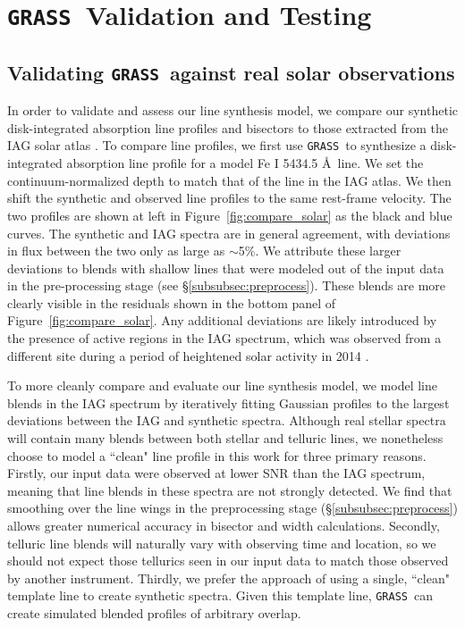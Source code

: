 \documentclass[twocolumn]{aastex63}
\newcommand{\grass}{\texttt{GRASS}}
\newcommand{\revise}[1]{#1}
\begin{document}
\section{\grass\ Validation and Testing} \label{validation}

\subsection{Validating \grass\ against real solar observations} \label{subsec:compare_solar}

In order to validate and assess our line synthesis model, we compare our synthetic disk-integrated absorption line profiles and bisectors to those extracted from the IAG solar atlas \citep{Reiners2016}. To compare line profiles, we first use \grass\ to synthesize a disk-integrated absorption line profile for a model Fe \textsc{I} 5434.5 \AA\ line. We set the continuum-normalized depth to match that of the line in the IAG atlas. We then shift the synthetic and observed line profiles to the same rest-frame velocity. The two profiles are shown at left in Figure~\ref{fig:compare_solar} as the black and blue curves. The synthetic and IAG spectra are in general agreement, with deviations in flux between the two only as large as $\sim$5$\%$. We attribute these larger deviations to blends with shallow lines that were modeled out of the input data in the pre-processing stage (see \S\ref{subsubsec:preprocess}). These blends are more clearly visible in the residuals shown in the bottom panel of Figure~\ref{fig:compare_solar}. Any additional deviations are likely introduced by the presence of active regions in the IAG spectrum, which was observed from a different site during a period of heightened solar activity in 2014 \citep{Hathaway2015, Reiners2016}.  \par 

\revise{To more cleanly compare and evaluate our line synthesis model, we model line blends in the IAG spectrum by iteratively fitting Gaussian profiles to the largest deviations between the IAG and synthetic spectra. Although real stellar spectra will contain many blends between both stellar and telluric lines, we nonetheless choose to model a ``clean" line profile in this work for three primary reasons. Firstly, our input data were observed at lower SNR than the IAG spectrum, meaning that line blends in these spectra are not strongly detected. We find that smoothing over the line wings in the preprocessing stage (\S\ref{subsubsec:preprocess}) allows greater numerical accuracy in bisector and width calculations. Secondly, telluric line blends will naturally vary with observing time and location, so we should not expect those tellurics seen in our input data to match those observed by another instrument. Thirdly, we prefer the approach of using a single, ``clean" template line to create synthetic spectra. Given this template line, \grass\ can create simulated blended profiles of arbitrary overlap.}
\end{document}
